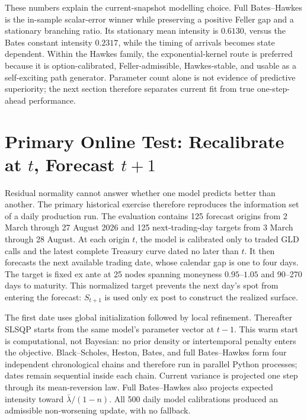 \documentclass[a4paper,10pt,titlepage,oneside,openany]{book}
\theoremstyle{plain}
\theoremstyle{definition}
\theoremstyle{remark}
\begin{document}
These numbers explain the current-snapshot modelling choice. Full Bates--Hawkes is the in-sample scalar-error winner while preserving a positive Feller gap and a stationary branching ratio. Its stationary mean intensity is \(0.6130\), versus the Bates constant intensity \(0.2317\), while the timing of arrivals becomes state dependent. Within the Hawkes family, the exponential-kernel route is preferred because it is option-calibrated, Feller-admissible, Hawkes-stable, and usable as a self-exciting path generator. Parameter count alone is not evidence of predictive superiority; the next section therefore separates current fit from true one-step-ahead performance.


\section{Primary Online Test: Recalibrate at \texorpdfstring{\(t\)}{t}, Forecast \texorpdfstring{\(t+1\)}{t+1}}

Residual normality cannot answer whether one model predicts better than another. The primary historical exercise therefore reproduces the information set of a daily production run. The evaluation contains 125 forecast origins from 2 March through 27 August 2026 and 125 next-trading-day targets from 3 March through 28 August. At each origin \(t\), the model is calibrated only to traded GLD calls and the latest complete Treasury curve dated no later than \(t\). It then forecasts the next available trading date, whose calendar gap is one to four days. The target is fixed ex ante at 25 nodes spanning moneyness \(0.95\)--\(1.05\) and 90--270 days to maturity. This normalized target prevents the next day's spot from entering the forecast: \(S_{t+1}\) is used only ex post to construct the realized surface.

The first date uses global initialization followed by local refinement. Thereafter SLSQP starts from the same model's parameter vector at \(t-1\). This warm start is computational, not Bayesian: no prior density or intertemporal penalty enters the objective. Black--Scholes, Heston, Bates, and full Bates--Hawkes form four independent chronological chains and therefore run in parallel Python processes; dates remain sequential inside each chain. Current variance is projected one step through its mean-reversion law. Full Bates--Hawkes also projects expected intensity toward \(\bar\lambda/(1-n)\). All 500 daily model calibrations produced an admissible non-worsening update, with no fallback.
\end{document}
